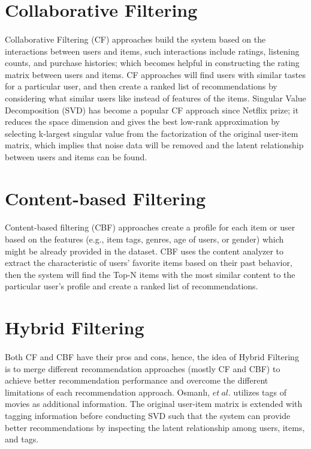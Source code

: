 \documentclass[a4paper,12pt]{report}
\begin{document}
\section{Collaborative Filtering}
\paragraph{}
Collaborative Filtering (CF) approaches build the system based on the interactions between users and items, such interactions include ratings, listening counts, and purchase histories; which becomes helpful in constructing the rating matrix between users and items. CF approaches will find users with similar tastes for a particular user, and then create a ranked list of recommendations by considering what similar users like instead of features of the items. Singular Value Decomposition (SVD) has become a popular CF approach since Netflix prize\cite{bennett2007netflix}; it reduces the space dimension and gives the best low-rank approximation by selecting k-largest singular value from the factorization of the original user-item matrix, which implies that noise data will be removed and the latent relationship between users and items can be found. 

\section{Content-based Filtering}
\paragraph{}
Content-based filtering (CBF) approaches create a profile for each item or user based on the features (e.g., item tags, genres, age of users, or gender) which might be already provided in the dataset. CBF uses the content analyzer to extract the characteristic of users' favorite items based on their past behavior, then the system will find the Top-N items with the most similar content to the particular user's profile and create a ranked list of recommendations.

\section{Hybrid Filtering}
\paragraph{}
Both CF and CBF have their pros and cons, hence, the idea of Hybrid Filtering is to merge different recommendation approaches (mostly CF and CBF) to achieve better recommendation performance and overcome the different limitations of each recommendation approach. Osmanlı, $et\ al.$\cite{osmanli2011using} utilizes tags of movies as additional information. The original user-item matrix is extended with tagging information before conducting SVD such that the system can provide better recommendations by inspecting the latent relationship among users, items, and tags.
\end{document}
